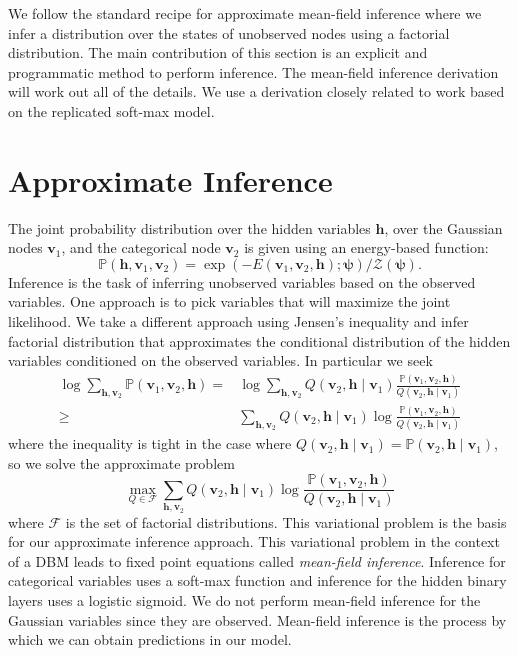 \documentclass{article} %
\begin{document}
We follow the standard recipe for approximate mean-field inference where we infer a distribution over the states of unobserved nodes
using a factorial distribution.  The main contribution of this section is an explicit and programmatic method to perform inference.
The mean-field inference derivation will work out all of the details.  We use a derivation closely related to work 
based on the replicated
soft-max model.

\section{Approximate Inference}

The joint probability distribution over the hidden variables $\mathbf{h}$, over the Gaussian nodes $\mathbf{v}_1$,
and the categorical node $\mathbf{v}_2$ is given using an energy-based function:
\begin{equation}
\mathbb{P}(\mathbf{h},\mathbf{v}_1,\mathbf{v}_2) = \exp(-E(\mathbf{v}_1,\mathbf{v}_2,\mathbf{h});\boldsymbol{\psi})/\mathcal{Z}(\boldsymbol{\psi}).
\end{equation}
Inference is the task of inferring unobserved variables based on the observed variables. One approach is to pick variables that will
maximize the joint likelihood.  We take a different approach using Jensen's inequality and infer factorial distribution that approximates
the conditional distribution of the hidden variables conditioned on the observed variables.
In particular we seek
\begin{align}
\log \sum_{\mathbf{h},\mathbf{v}_2} \mathbb{P}(\mathbf{v}_1,\mathbf{v}_2,\mathbf{h}) =& \log \sum_{\mathbf{h},\mathbf{v}_2} Q(\mathbf{v}_2,\mathbf{h}\mid\mathbf{v}_1) \frac{\mathbb{P}(\mathbf{v}_1,\mathbf{v}_2,\mathbf{h})}{Q(\mathbf{v}_2,\mathbf{h}\mid\mathbf{v}_1)}\\
\geq& \sum_{\mathbf{h},\mathbf{v}_2} Q(\mathbf{v}_2,\mathbf{h}\mid\mathbf{v}_1) \log \frac{\mathbb{P}(\mathbf{v}_1,\mathbf{v}_2,\mathbf{h})}{Q(\mathbf{v}_2,\mathbf{h}\mid\mathbf{v}_1)}
\end{align}
where the inequality is tight in the case where $Q(\mathbf{v}_2,\mathbf{h}\mid\mathbf{v}_1)=\mathbb{P}(\mathbf{v}_2,\mathbf{h}\mid\mathbf{v}_1)$, so we solve the approximate problem
\begin{equation}
\max_{Q\in\mathcal{F}}\sum_{\mathbf{h},\mathbf{v}_2} Q(\mathbf{v}_2,\mathbf{h}\mid\mathbf{v}_1) \log \frac{\mathbb{P}(\mathbf{v}_1,\mathbf{v}_2,\mathbf{h})}{Q(\mathbf{v}_2,\mathbf{h}\mid\mathbf{v}_1)}
\end{equation}
where $\mathcal{F}$ is the set of factorial distributions. This variational problem is the basis for our approximate inference approach.
This variational problem in the context of a DBM leads to fixed point equations called {\it mean-field inference}.  Inference for
categorical variables uses a soft-max function and inference for the hidden binary layers uses a logistic sigmoid.  We do not perform
mean-field inference for the Gaussian variables since they are observed.  Mean-field inference is the process by which we can obtain
predictions in our model.
\end{document}
